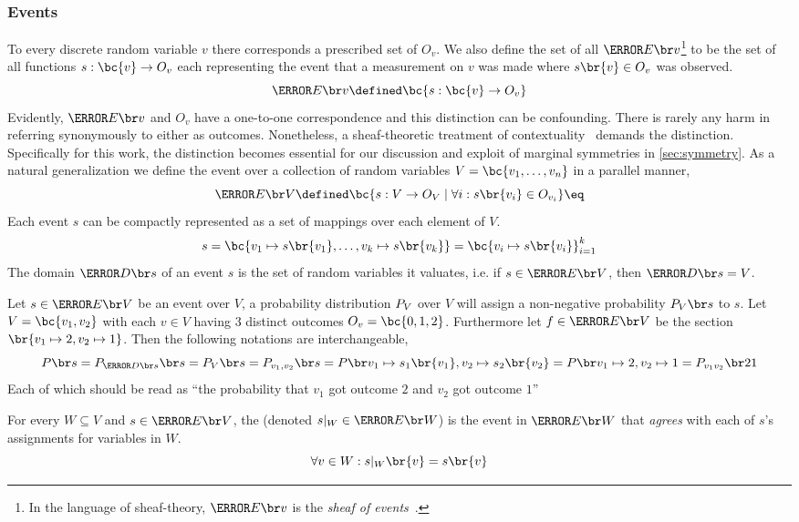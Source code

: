\documentclass[aps, 10pt, english, twoside, pra, nofootinbib, longbibliography]{revtex4-1}
\begin{document}
    \subsubsection{Events}
    To every discrete random variable $v$ there corresponds a prescribed set of  $O_v$. We also define the set of all  $\Events{v}$\footnote{In the language of sheaf-theory, $\Events{v}$ is the \textit{sheaf of events}~\cite{Abramsky_2011}.} to be the set of all functions $s : \bc{v} \to O_v$ each representing the event that a measurement on $v$ was made where $s\br{v} \in O_v$ was observed.
    \[ \Events{v} \defined \bc{s : \bc{v} \to O_v} \label{eq:outcome_space} \]
    Evidently, $\Events{v}$ and $O_v$ have a one-to-one correspondence and this distinction can be confounding. There is rarely any harm in referring synonymously to either as outcomes. Nonetheless, a sheaf-theoretic treatment of contextuality~\cite{Abramsky_2011} demands the distinction.
    Specifically for this work, the distinction becomes essential for our discussion and exploit of marginal symmetries in \cref{sec:symmetry}. As a natural generalization we define the event over a collection of random variables $V = \bc{v_1, \ldots, v_n}$ in a parallel manner,
    \[ \Events{V} \defined \bc{s: V \to O_{V} \mid \forall i : s\br{v_i} \in O_{v_i} } \eq \label{eq:outcome_space}\]
    Each event $s$ can be compactly represented as a set of mappings over each element of $V$.
    \[ s = \bc{v_1 \mapsto s\br{v_1}, \ldots, v_k \mapsto s\br{v_k}} = \bc{v_i\mapsto s\br{v_i}}_{i = 1}^{k} \]
    The domain $\Dom{s}$ of an event $s$ is the set of random variables it valuates, i.e. if $s \in \Events{V}$, then $\Dom{s} = V$.
    \begin{example}
        Let $s \in \Events{V}$ be an event over $V$, a probability distribution $\prob[V]$ over $V$ will assign a non-negative probability $\prob[V][s]$ to $s$. Let $V = \bc{v_1, v_2}$ with each $v \in V$ having $3$ distinct outcomes $O_v = \bc{0,1,2}$. Furthermore let $f \in \Events{V}$ be the section $\br{v_1 \mapsto 2, v_2 \mapsto 1}$. Then the following notations are interchangeable,
        \[ \prob[][s] = \prob[\Dom{s}][s] = \prob[V][s] = \prob[v_1, v_2][s] = \prob[][v_1 \mapsto s_1\br{v_1}, v_2 \mapsto s_2\br{v_2}] = \prob[][v_1 \mapsto 2, v_2 \mapsto 1] = \prob[v_1v_2][21] \]
        Each of which should be read as ``the probability that $v_1$ got outcome $2$ and $v_2$ got outcome $1$''
    \end{example}
    \begin{definition}
    \label{def:section_restriction}
    For every $W \subseteq V$ and $s \in \Events{V}$, the  (denoted $s|_{W} \in \Events{W}$) is the event in $\Events{W}$ that \textit{agrees} with each of $s$'s assignments for variables in $W$.
    \[ \forall v \in W : s|_{W}\br{v} = s\br{v} \]
    \end{definition}
\end{document}
